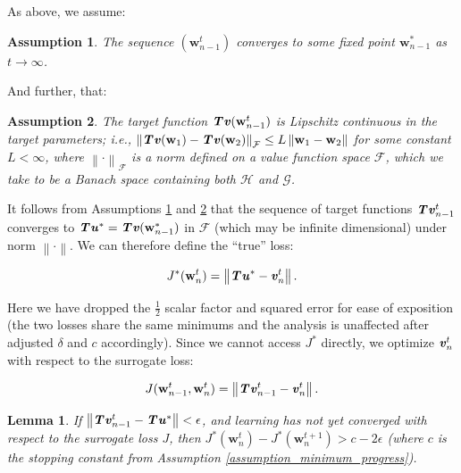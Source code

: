 \documentclass{article}
\renewcommand{\vec}[1]{\textbf{\textit{#1}}}
\newcommand{\val}{\vec{v}}
\newcommand{\valt}{\val}
\newcommand{\target}{\vec{u}}
\newcommand{\params}{\textbf{w}}
\newcommand{\bellmanop}{\textbf{\textit{T}}}
\newcommand{\norm}[1]{\left\lVert #1 \right\rVert}
\newtheorem{lemma}{Lemma}
\newtheorem{assumption}{Assumption}
\begin{document}
As above, we assume:

\begin{assumption}
	\label{assumption_converging_target_2}
		The sequence $(\params_{n-1}^t)$ converges to some fixed point $\params_{n-1}^*$ as $t \to \infty$.
\end{assumption}

And further, that:

\begin{assumption}
	\label{assumption_Lipschitz}
		The target function $\bellmanop\valt(\params_{n-1}^t)$ is Lipschitz continuous in the target parameters; i.e.,
		$\norm{\bellmanop\valt(\params_1) - \bellmanop\valt(\params_2)}_\mathcal{F} \leq L\norm{\params_1 - \params_2}$
		for some constant $L < \infty$, where $\norm{\cdot}_\mathcal{F}$ is a norm defined on a value function space $\mathcal{F}$, which we take to be a Banach space containing both $\mathcal{H}$ and $\mathcal{G}$.
\end{assumption}


It follows from Assumptions \ref{assumption_converging_target_2} and \ref{assumption_Lipschitz} that the sequence of target functions $\bellmanop\valt_{n-1}^t$ converges to $\bellmanop\target^* = \bellmanop\valt(\params_{n-1}^*)$ in $\mathcal{F}$ (which may be infinite dimensional) under norm $\norm{\cdot}$. We can therefore define the ``true'' loss:

\begin{equation}
	J^*(\params_n^t) = \norm{\bellmanop\target^* - \valt_n^t}.
\end{equation}

Here we have dropped the $\frac{1}{2}$ scalar factor and squared error for ease of exposition (the two losses share the same minimums and the analysis is unaffected after adjusted $\delta$ and $c$ accordingly). Since we cannot access $J^*$ directly, we optimize $\valt_n^t$ with respect to the surrogate loss:

\begin{equation}
	J(\params_{n-1}^t, \params_n^t) = \norm{\bellmanop\valt_{n-1}^t - \valt_n^t}.
\end{equation}


\begin{lemma}\label{lemma_strict_progress}
	If $\norm{\bellmanop\valt_{n-1}^t - \bellmanop\target^*} < \epsilon$,
	and learning has not yet converged with respect to the surrogate loss $J$, then $J^*(\params_n^t) -J^*(\params_n^{t+1}) > c - 2\epsilon$ (where $c$ is the stopping constant from Assumption \ref{assumption_minimum_progress}).
\end{lemma}
\end{document}
